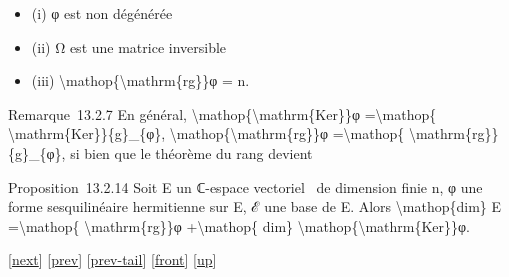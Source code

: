 \documentclass[]{article}
\begin{document}
\begin{itemize}
\itemsep1pt\parskip0pt
\item
  (i) φ est non dégénérée
\item
  (ii) Ω est une matrice inversible
\item
  (iii) \textbackslash{}mathop\{\textbackslash{}mathrm\{rg\}\}φ = n.
\end{itemize}

Remarque~13.2.7 En général,
\textbackslash{}mathop\{\textbackslash{}mathrm\{Ker\}\}φ
=\textbackslash{}mathop\{ \textbackslash{}mathrm\{Ker\}\}\{g\}\_\{φ\},
\textbackslash{}mathop\{\textbackslash{}mathrm\{rg\}\}φ
=\textbackslash{}mathop\{ \textbackslash{}mathrm\{rg\}\}\{g\}\_\{φ\}, si
bien que le théorème du rang devient

Proposition~13.2.14 Soit E un ℂ-espace vectoriel ~de dimension finie n,
φ une forme sesquilinéaire hermitienne sur E, ℰ une base de E. Alors
\textbackslash{}mathop\{dim\} E =\textbackslash{}mathop\{
\textbackslash{}mathrm\{rg\}\}φ +\textbackslash{}mathop\{ dim\}
\textbackslash{}mathop\{\textbackslash{}mathrm\{Ker\}\}φ.

{[}\href{coursse75.html}{next}{]} {[}\href{coursse73.html}{prev}{]}
{[}\href{coursse73.html\#tailcoursse73.html}{prev-tail}{]}
{[}\href{coursse74.html}{front}{]}
{[}\href{coursch14.html\#coursse74.html}{up}{]}
\end{document}

